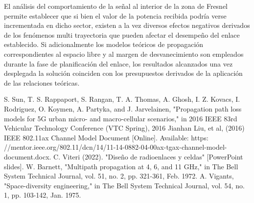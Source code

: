 \documentclass[conference]{IEEEtran}
\begin{document}
El análisis del comportamiento de la señal al interior de la zona de Fresnel permite establecer que si bien el valor de la potencia
recibida podría verse incrementada en dicho sector, existen a la vez diversos efectos negativos derivados de los fenómenos multi trayectoria
que pueden afectar el desempeño del enlace establecido. Si adicionalmente los modelos teóricos de propagación correspondientes al espacio libre y 
al margen de desvanecimiento son empleados durante la fase de planificación del enlace, los resultados alcanzados una vez desplegada la solución
coinciden con los presupuestos derivados de la aplicación de las relaciones teóricas.
\begin{thebibliography}{00}
     S. Sun, T. S. Rappaport, S. Rangan, T. A. Thomas, A. Ghosh, I. Z. Kovacs, I. Rodriguez, O. Koymen, A. Partyka,
    and J. Jarvelainen, "Propagation path loss models for 5G urban micro- and macro-cellular scenarios," in 2016
    IEEE 83rd Vehicular Technology Conference (VTC Spring), 2016
     Jianhan Liu, et al, (2016) IEEE 802.11ax Channel Model Document  [Online]. Available: https:
    //mentor.ieee.org/802.11/dcn/14/11-14-0882-04-00ax-tgax-channel-model-document.docx.
     C. Viteri (2022). "Diseño de radioenlaces y celdas" [PowerPoint slides]. 
     W. Barnett, "Multipath propagation at 4, 6, and 11 GHz," in The Bell System Technical Journal, 
    vol. 51, no. 2, pp. 321-361, Feb. 1972.
     A. Vigants, "Space-diversity engineering," in The Bell System Technical Journal, vol. 54, 
    no. 1, pp. 103-142, Jan. 1975.
\end{thebibliography}
\end{document}
